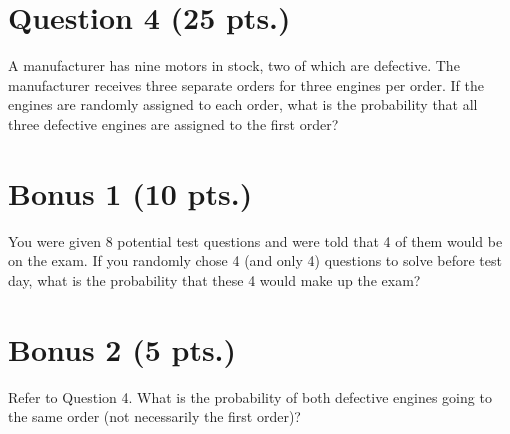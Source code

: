 \documentclass[11pt]{article}
\theoremstyle{definition}
\begin{document}
\newpage

\section*{Question 4 (25 pts.)}

A manufacturer has nine motors in stock, two of which are defective. The manufacturer receives three separate orders for three engines per order. If the engines are randomly assigned to each order, what is the probability that all three defective engines are assigned to the first order?

\newpage

\section*{Bonus 1  (10 pts.)}

You were given 8 potential test questions and were told that 4 of them would be on the exam. If you randomly chose 4 (and only 4) questions to solve before test day, what is the probability that these 4 would make up the exam?

\vfill

\section*{Bonus 2 (5 pts.)}

Refer to Question 4. What is the probability of both defective engines going to the same order (not necessarily the first order)?

\vfill
\end{document}
